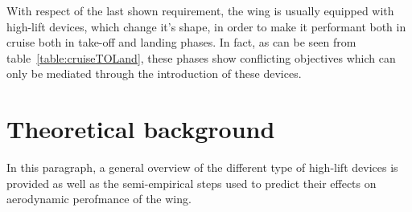 \noindent
With respect of the last shown requirement, the wing is usually equipped with high-lift devices, which change it's shape, in order to make it performant both in cruise both in take-off and landing phases. In fact, as can be seen from table~\ref{table:cruiseTOLand}, these phases show conflicting objectives which can only be mediated through the introduction of these devices.
%
\begin{table}[H]
\caption{Comparison between cruise and take-off/landing design requirements}
\label{table:cruiseTOLand}
\end{table}
%
\section{Theoretical background}
\label{sec:theoryFlapSlat}
In this paragraph, a general overview of the different type of high-lift devices is provided as well as the semi-empirical steps used to predict their effects on aerodynamic perofmance of the wing.

